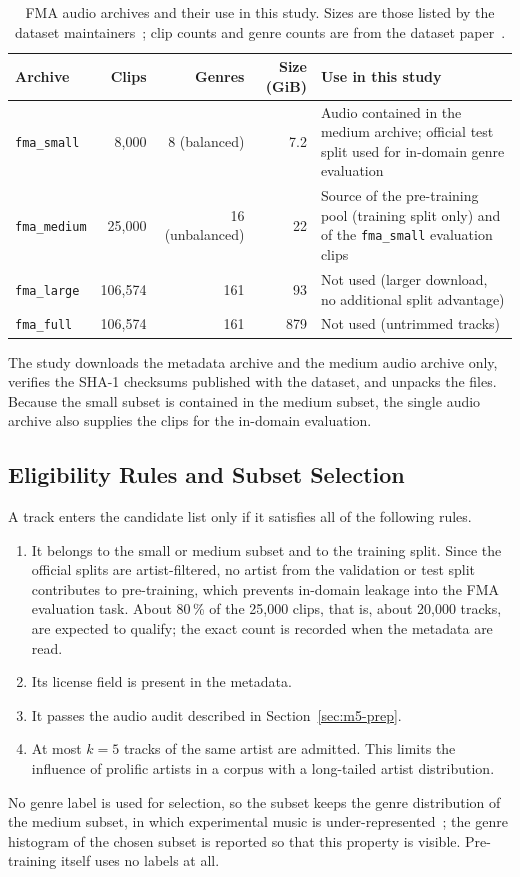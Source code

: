 \documentclass{FastFyp}
\begin{document}
\begin{table}[htbp]
\centering
\caption[FMA audio archives and their use in this study]{FMA audio archives and their use in this study. Sizes are those listed by the dataset maintainers~\cite{ref:FMAGit}; clip counts and genre counts are from the dataset paper~\cite{ref:Defferrard:2017fma}.}
\label{tab:m5-fma}
\small\singlespacing
\begin{tabularx}{\linewidth}{lrrrY}
\toprule
\textbf{Archive} & \textbf{Clips} & \textbf{Genres} & \textbf{Size (GiB)} & \textbf{Use in this study}\\
\midrule
\texttt{fma\_small} & 8,000 & 8 (balanced) & 7.2 & Audio contained in the medium archive; official test split used for in-domain genre evaluation\\
\texttt{fma\_medium} & 25,000 & 16 (unbalanced) & 22 & Source of the pre-training pool (training split only) and of the \texttt{fma\_small} evaluation clips\\
\texttt{fma\_large} & 106,574 & 161 & 93 & Not used (larger download, no additional split advantage)\\
\texttt{fma\_full} & 106,574 & 161 & 879 & Not used (untrimmed tracks)\\
\bottomrule
\end{tabularx}
\end{table}

The study downloads the metadata archive and the medium audio archive only, verifies the SHA-1 checksums published with the dataset, and unpacks the files. Because the small subset is contained in the medium subset, the single audio archive also supplies the clips for the in-domain evaluation.

\subsection{Eligibility Rules and Subset Selection}
A track enters the candidate list only if it satisfies all of the following rules.
\begin{enumerate}
  \item It belongs to the small or medium subset and to the training split. Since the official splits are artist-filtered, no artist from the validation or test split contributes to pre-training, which prevents in-domain leakage into the FMA evaluation task. About 80\,\% of the 25,000 clips, that is, about 20,000 tracks, are expected to qualify; the exact count is recorded when the metadata are read.
  \item Its license field is present in the metadata.
  \item It passes the audio audit described in Section~\ref{sec:m5-prep}.
  \item At most $k=5$ tracks of the same artist are admitted. This limits the influence of prolific artists in a corpus with a long-tailed artist distribution.
\end{enumerate}
No genre label is used for selection, so the subset keeps the genre distribution of the medium subset, in which experimental music is under-represented~\cite{ref:Defferrard:2017fma}; the genre histogram of the chosen subset is reported so that this property is visible. Pre-training itself uses no labels at all.
\end{document}
